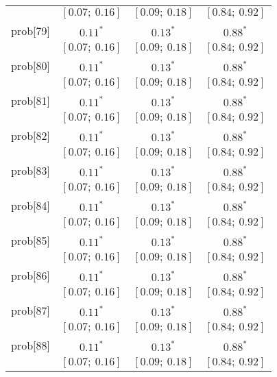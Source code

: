 \begin{table}
\begin{center}
\begin{tabular}{l c c c }
          & $[0.07;\ 0.16]$         & $[0.09;\ 0.18]$         & $[0.84;\ 0.92]$       \\
prob[79]  & $0.11^{*}$              & $0.13^{*}$              & $0.88^{*}$            \\
          & $[0.07;\ 0.16]$         & $[0.09;\ 0.18]$         & $[0.84;\ 0.92]$       \\
prob[80]  & $0.11^{*}$              & $0.13^{*}$              & $0.88^{*}$            \\
          & $[0.07;\ 0.16]$         & $[0.09;\ 0.18]$         & $[0.84;\ 0.92]$       \\
prob[81]  & $0.11^{*}$              & $0.13^{*}$              & $0.88^{*}$            \\
          & $[0.07;\ 0.16]$         & $[0.09;\ 0.18]$         & $[0.84;\ 0.92]$       \\
prob[82]  & $0.11^{*}$              & $0.13^{*}$              & $0.88^{*}$            \\
          & $[0.07;\ 0.16]$         & $[0.09;\ 0.18]$         & $[0.84;\ 0.92]$       \\
prob[83]  & $0.11^{*}$              & $0.13^{*}$              & $0.88^{*}$            \\
          & $[0.07;\ 0.16]$         & $[0.09;\ 0.18]$         & $[0.84;\ 0.92]$       \\
prob[84]  & $0.11^{*}$              & $0.13^{*}$              & $0.88^{*}$            \\
          & $[0.07;\ 0.16]$         & $[0.09;\ 0.18]$         & $[0.84;\ 0.92]$       \\
prob[85]  & $0.11^{*}$              & $0.13^{*}$              & $0.88^{*}$            \\
          & $[0.07;\ 0.16]$         & $[0.09;\ 0.18]$         & $[0.84;\ 0.92]$       \\
prob[86]  & $0.11^{*}$              & $0.13^{*}$              & $0.88^{*}$            \\
          & $[0.07;\ 0.16]$         & $[0.09;\ 0.18]$         & $[0.84;\ 0.92]$       \\
prob[87]  & $0.11^{*}$              & $0.13^{*}$              & $0.88^{*}$            \\
          & $[0.07;\ 0.16]$         & $[0.09;\ 0.18]$         & $[0.84;\ 0.92]$       \\
prob[88]  & $0.11^{*}$              & $0.13^{*}$              & $0.88^{*}$            \\
          & $[0.07;\ 0.16]$         & $[0.09;\ 0.18]$         & $[0.84;\ 0.92]$       \\

\end{tabular}
\end{center}
\end{table}
